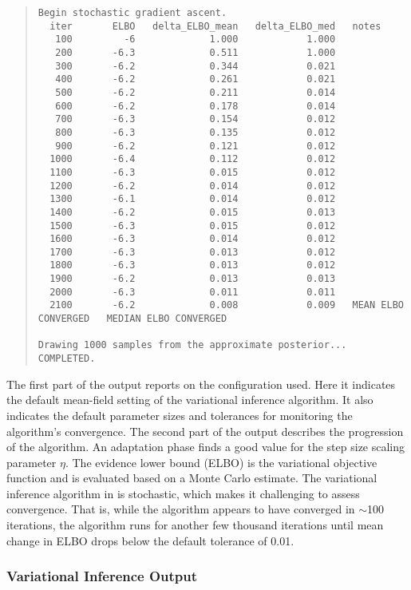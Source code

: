 \begin{quote}
\begin{Verbatim}[fontsize=\footnotesize]
Begin stochastic gradient ascent.
  iter       ELBO   delta_ELBO_mean   delta_ELBO_med   notes
   100         -6             1.000            1.000
   200       -6.3             0.511            1.000
   300       -6.2             0.344            0.021
   400       -6.2             0.261            0.021
   500       -6.2             0.211            0.014
   600       -6.2             0.178            0.014
   700       -6.3             0.154            0.012
   800       -6.3             0.135            0.012
   900       -6.2             0.121            0.012
  1000       -6.4             0.112            0.012
  1100       -6.3             0.015            0.012
  1200       -6.2             0.014            0.012
  1300       -6.1             0.014            0.012
  1400       -6.2             0.015            0.013
  1500       -6.3             0.015            0.012
  1600       -6.3             0.014            0.012
  1700       -6.3             0.013            0.012
  1800       -6.3             0.013            0.012
  1900       -6.2             0.013            0.013
  2000       -6.3             0.011            0.011
  2100       -6.2             0.008            0.009   MEAN ELBO CONVERGED   MEDIAN ELBO CONVERGED

Drawing 1000 samples from the approximate posterior... COMPLETED.
\end{Verbatim}
\end{quote}
%
The first part of the output reports on the configuration used. Here
it indicates the default mean-field setting of the variational
inference algorithm. It also indicates the default parameter sizes and
tolerances for monitoring the algorithm's convergence. The second part
of the output describes the progression of the algorithm. An adaptation
phase finds a good value for the step size scaling parameter $\eta$. The
evidence
lower bound (ELBO) is the variational objective function and is
evaluated based on a Monte Carlo estimate. The variational inference
algorithm in \Stan is stochastic, which makes it challenging to assess
convergence. That is, while the algorithm appears to have converged in
$\sim$100 iterations, the algorithm runs for another few thousand
iterations until mean change in ELBO drops below the default
tolerance of 0.01.


\subsubsection{Variational Inference Output}

